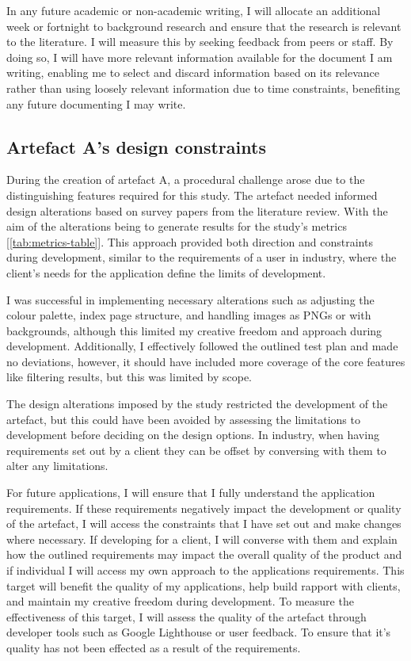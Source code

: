 \documentclass[article]{IEEEtran}
\begin{document}
                In any future academic or non-academic writing, I will allocate an additional week or fortnight to background research and ensure that the research is relevant to the literature. I will measure this by seeking feedback from peers or staff. By doing so, I will have more relevant information available for the document I am writing, enabling me to select and discard information based on its relevance rather than using loosely relevant information due to time constraints, benefiting any future documenting I may write.

            \subsection{Artefact A's design constraints}
                During the creation of artefact A, a procedural challenge arose due to the distinguishing features required for this study. The artefact needed informed design alterations based on survey papers \cite{udo, sudiana} from the literature review. With the aim of the alterations being to generate results for the study's metrics [\autoref{tab:metrics-table}]. This approach provided both direction and constraints during development, similar to the requirements of a user in industry, where the client's needs for the application define the limits of development.
    
                I was successful in implementing necessary alterations such as adjusting the colour palette, index page structure, and handling images as PNGs or with backgrounds, although this limited my creative freedom and approach during development. Additionally, I effectively followed the outlined test plan and made no deviations, however, it should have included more coverage of the core features like filtering results, but this was limited by scope.
                
                The design alterations imposed by the study restricted the development of the artefact, but this could have been avoided by assessing the limitations to development before deciding on the design options. In industry, when having requirements set out by a client they can be offset by conversing with them to alter any limitations.
    
                For future applications, I will ensure that I fully understand the application requirements. If these requirements negatively impact the development or quality of the artefact, I will access the constraints that I have set out and make changes where necessary. If developing for a client, I will converse with them and explain how the outlined requirements may impact the overall quality of the product and if individual I will access my own approach to the applications requirements. This target will benefit the quality of my applications, help build rapport with clients, and maintain my creative freedom during development. To measure the effectiveness of this target, I will assess the quality of the artefact through developer tools such as Google Lighthouse or user feedback. To ensure that it's quality has not been effected as a result of the requirements.
\end{document}
